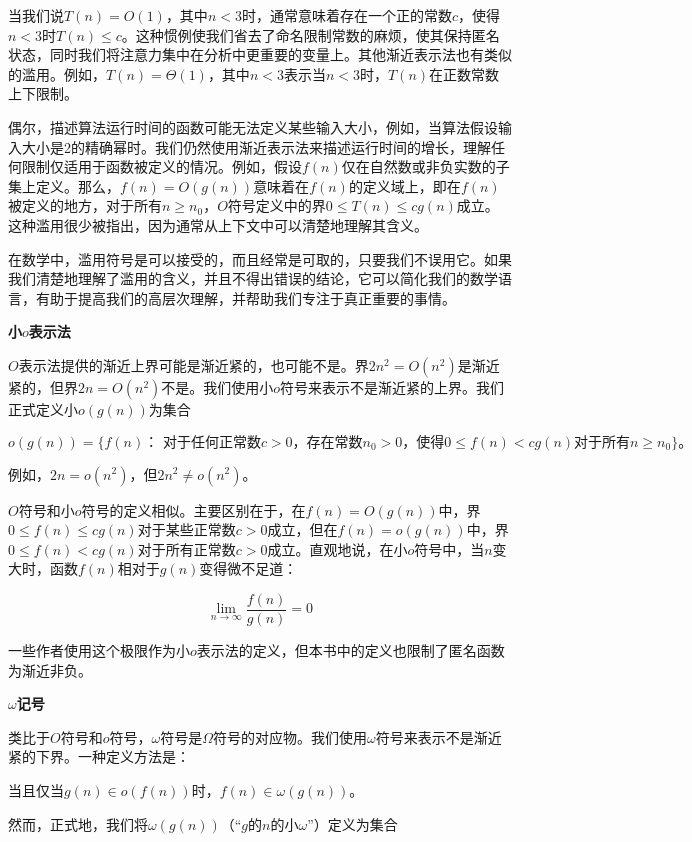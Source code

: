 \documentclass[lang=cn,newtx,10pt,scheme=chinese]{elegantbook}
\begin{document}
当我们说$T(n)=O(1)$，其中$n<3$时，通常意味着存在一个正的常数$c$，使得$n<3$时$T(n) \leq c$。这种惯例使我们省去了命名限制常数的麻烦，使其保持匿名状态，同时我们将注意力集中在分析中更重要的变量上。其他渐近表示法也有类似的滥用。例如，$T(n)=\Theta(1)$，其中$n<3$表示当$n<3$时，$T(n)$在正数常数上下限制。

偶尔，描述算法运行时间的函数可能无法定义某些输入大小，例如，当算法假设输入大小是2的精确幂时。我们仍然使用渐近表示法来描述运行时间的增长，理解任何限制仅适用于函数被定义的情况。例如，假设$f(n)$仅在自然数或非负实数的子集上定义。那么，$f(n)=O(g(n))$意味着在$f(n)$的定义域上，即在$f(n)$被定义的地方，对于所有$n \geq n_0$，$O$符号定义中的界$0 \leq T(n) \leq c g(n)$成立。这种滥用很少被指出，因为通常从上下文中可以清楚地理解其含义。

在数学中，滥用符号是可以接受的，而且经常是可取的，只要我们不误用它。如果我们清楚地理解了滥用的含义，并且不得出错误的结论，它可以简化我们的数学语言，有助于提高我们的高层次理解，并帮助我们专注于真正重要的事情。

\textbf{小$o$表示法}

$O$表示法提供的渐近上界可能是渐近紧的，也可能不是。界$2 n^2=O\left(n^2\right)$是渐近紧的，但界$2 n=O\left(n^2\right)$不是。我们使用小$o$符号来表示不是渐近紧的上界。我们正式定义小$o(g(n))$为集合

$$
o(g(n))=\{f(n)：\text { 对于任何正常数} c>0，\text{存在常数} n_0>0 \text {，使得} 0 \leq f(n)<c g(n) \text {对于所有} n \geq n_0\}。
$$

例如，$2 n=o\left(n^2\right)$，但$2 n^2 \neq o\left(n^2\right)$。

$O$符号和小$o$符号的定义相似。主要区别在于，在$f(n)=O(g(n))$中，界$0 \leq f(n) \leq c g(n)$对于某些正常数$c>0$成立，但在$f(n)=o(g(n))$中，界$0 \leq f(n)<c g(n)$对于所有正常数$c>0$成立。直观地说，在小$o$符号中，当$n$变大时，函数$f(n)$相对于$g(n)$变得微不足道：

$$
\lim _{n \rightarrow \infty} \frac{f(n)}{g(n)}=0
$$

一些作者使用这个极限作为小$o$表示法的定义，但本书中的定义也限制了匿名函数为渐近非负。

\textbf{$\omega$记号}

类比于$O$符号和$o$符号，$\omega$符号是$\Omega$符号的对应物。我们使用$\omega$符号来表示不是渐近紧的下界。一种定义方法是：

当且仅当$g(n) \in o(f(n))$时，$f(n) \in \omega(g(n))$。

然而，正式地，我们将$\omega(g(n))$（``$g$的$n$的小$\omega$''）定义为集合
\end{document}
